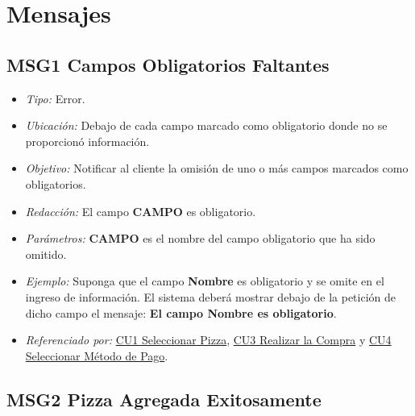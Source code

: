 
\section{Mensajes}

	\hypertarget{MSG1:CamposObligatorios}{}
	\subsection{MSG1 Campos Obligatorios Faltantes}

		\begin{itemize}

			\item \textit{Tipo:} Error.

			\item\textit{Ubicación:}  Debajo de cada campo marcado como obligatorio donde no se proporcionó información.

			\item \textit{Objetivo:} Notificar al cliente la omisión de uno o más campos marcados como obligatorios.

			\item \textit{Redacción:} El campo \textbf{CAMPO} es obligatorio.

			\item \textit{Parámetros:} \textbf{CAMPO} es el nombre del campo obligatorio que ha sido omitido.

			\item \textit{Ejemplo:} Suponga que el campo \textbf{Nombre} es obligatorio y se omite en el ingreso de información. El sistema deberá mostrar debajo de la petición de dicho campo el mensaje: \textbf{El campo Nombre es obligatorio}.

			\item \textit{Referenciado por:} \hyperlink{CU1}{CU1 Seleccionar Pizza}, \hyperlink{CU3}{CU3 Realizar la Compra} y \hyperlink{CU4}{CU4 Seleccionar Método de Pago}.

		\end{itemize}
	
\hypertarget{MSG2:PizzaAgregada}{}
\subsection{MSG2 Pizza Agregada Exitosamente}

